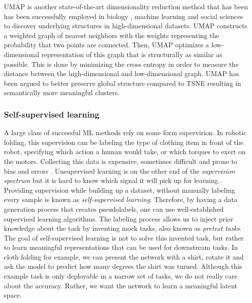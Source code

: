 \documentclass[\home/main.tex]{subfiles}
\begin{document}
\Gls{UMAP} is another state-of-the-art dimensionality reduction method that has been has been successfully employed in biology \autocite{cao2019single}, machine learning \autocite{carter2019activation} and social sciences \autocite{diaz2019umap} to discover underlying structures in high-dimensional datasets. \Gls{UMAP} constructs a weighted graph of nearest neighbors with the weights representing the probability that two points are connected. Then, UMAP optimizes a low-dimensional representation of this graph that is structurally as similar as possible. This is done by minimizing the cross entropy in order to measure the distance between the high-dimensional and low-dimensional graph. \gls{UMAP} has been argued to better preserve global structure compared to \gls{TSNE} \autocite{becht2019dimensionality} resulting in semantically more meaningful clusters. 

\subsubsection{Self-supervised learning} \label{subsec:lit_ssl}
A large class of successful \gls{ML} methods rely on some form supervision. In robotic folding, this supervision can be labeling the type of clothing item in front of the robot, specifying which action a human would take, or which torques to exert on the motors. Collecting this data is expensive, sometimes difficult and prone to bias and errors \autocite{mehrabi2021survey}. Unsupervised learning is on the other end of the \textit{supervision spectrum} but it is hard to know which signal it will pick up for learning. Providing supervision while building up a dataset, without manually labeling every sample is known as \emph{self-supervised learning}. Therefore, by having a data generation process that creates pseudolabels, one can use well-established supervised learning algorithms. The labeling process allows us to inject prior knowledge about the task by inventing mock tasks, also known as \emph{pretext tasks}. The goal of self-supervised learning is not to solve this invented task, but rather to learn meaningful representations that can be used for downstream tasks. In cloth folding for example, we can present the network with a shirt, rotate it and ask the model to predict how many degrees the shirt was turned. Although this example task is only deployable in a narrow set of tasks, we do not really care about the accuracy. Rather, we want the network to learn a meaningful latent space.
\end{document}

